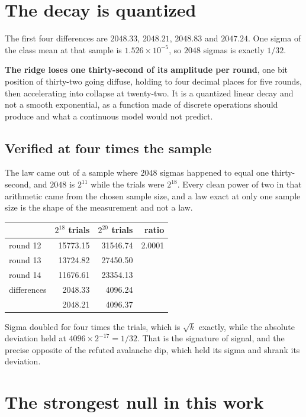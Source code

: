 \section{The decay is quantized}

The first four differences are \(2048.33\), \(2048.21\), \(2048.83\) and \(2047.24\). One sigma of the class mean at that sample is \(1.526 \times 10^{-5}\), so \(2048\) sigmas is exactly \(1/32\).

\textbf{The ridge loses one thirty-second of its amplitude per round}, one bit position of thirty-two going diffuse, holding to four decimal places for five rounds, then accelerating into collapse at twenty-two. It is a quantized linear decay and not a smooth exponential, as a function made of discrete operations should produce and what a continuous model would not predict.

\subsection{Verified at four times the sample}

The law came out of a sample where \(2048\) sigmas happened to equal one thirty-second, and \(2048\) is \(2^{11}\) while the trials were \(2^{18}\). Every clean power of two in that arithmetic came from the chosen sample size, and a law exact at only one sample size is the shape of the measurement and not a law.

\begin{center}
\begin{tabular}{lrrr}
\toprule
 & \(2^{18}\) trials & \(2^{20}\) trials & ratio \\
\midrule
round 12 & 15773.15 & 31546.74 & 2.0001 \\
round 13 & 13724.82 & 27450.50 & \\
round 14 & 11676.61 & 23354.13 & \\
\midrule
differences & 2048.33 & 4096.24 & \\
 & 2048.21 & 4096.37 & \\
\bottomrule
\end{tabular}
\end{center}

Sigma doubled for four times the trials, which is \(\sqrt{k}\) exactly, while the absolute deviation held at \(4096 \times 2^{-17} = 1/32\). That is the signature of signal, and the precise opposite of the refuted avalanche dip, which held its sigma and shrank its deviation.

\section{The strongest null in this work}

